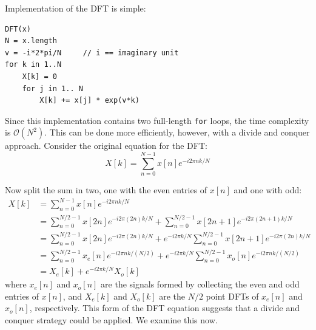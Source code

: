 Implementation of the DFT is simple:
\begin{lstlisting}
DFT(x)
N = x.length
v = -i*2*pi/N     // i == imaginary unit
for k in 1..N
    X[k] = 0
    for j in 1.. N
        X[k] += x[j] * exp(v*k)
\end{lstlisting}
Since this implementation contains two full-length \texttt{for} loops, the time complexity is $\mathcal{O}(N^2)$. This can be done more efficiently, however, with a divide and conquer approach. Consider the original equation for the DFT:
\[
X[k] = \sum_{n=0}^{N-1}x[n]e^{-i2\pi n k /N}
\]

Now split the sum in two, one with the even entries of $x[n]$ and one with odd:
\begin{align*}
X[k] &= \sum_{n=0}^{N-1}x[n]e^{-i2\pi n k /N}\\
&= \sum_{n=0}^{N/2-1}x[2n]e^{-i2\pi (2n) k /N} + \sum_{n=0}^{N/2-1}x[2n+1]e^{-i2\pi (2n+1) k /N}\\
&= \sum_{n=0}^{N/2-1}x[2n]e^{-i2\pi (2n) k /N} + e^{-i2\pi k/N}\sum_{n=0}^{N/2-1}x[2n+1]e^{-i2\pi (2n) k /N}\\
&= \sum_{n=0}^{N/2-1}x_e[n]e^{-i2\pi n k /(N/2)} + e^{-i2\pi k/N}\sum_{n=0}^{N/2-1}x_o[n]e^{-i2\pi n k /(N/2)}\\
&= X_e[k] + e^{-i2\pi k/N}X_o[k] \tag{*} \label{evenOdd} 
\end{align*}
where $x_e[n]$ and $x_o[n]$ are the signals formed by collecting the even and odd entries of $x[n]$, and $X_e[k]$ and $X_o[k]$ are the $N/2$ point DFTs of $x_e[n]$ and $x_o[n]$, respectively. This form of the DFT equation suggests that a divide and conquer strategy could be applied. We examine this now.

